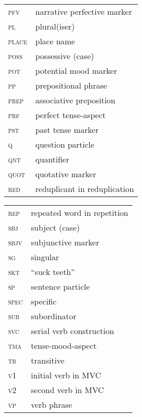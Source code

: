 \begin{tabularx}{.45\textwidth}{lQ}
\textsc{pfv} & narrative perfective marker\\
\textsc{pl} & plural(iser)\\
\textsc{place} & place name\\
\textsc{poss} & possessive (case)\\
\textsc{pot} & potential mood marker\\
\textsc{pp} & prepositional phrase\\
\textsc{prep} & associative preposition\\
\textsc{prf} & perfect tense-aspect\\
\textsc{pst} & past tense marker\\
\textsc{q} & question particle\\
\textsc{qnt} & quantifier\\
\textsc{quot} & quotative marker\\
\textsc{red} & reduplicant in reduplication\\
\end{tabularx}
\begin{tabularx}{.45\textwidth}{lQ}
\textsc{rep} & repeated word in repetition\\
\textsc{sbj} & subject (case)\\
\textsc{sbjv} & subjunctive marker\\
\textsc{sg} & singular\\
\textsc{skt} & “suck teeth”\\
\textsc{sp} & sentence particle\\
\textsc{spec} & specific\\
\textsc{sub} & subordinator\\
\textsc{svc} & serial verb construction\\
\textsc{tma} & tense-mood-aspect\\
\textsc{tr} & transitive\\
\textsc{v1} & initial verb in \textsc{MVC}\\
\textsc{v2} & second verb in \textsc{MVC}\\
\textsc{vp} & verb phrase\\
\end{tabularx}